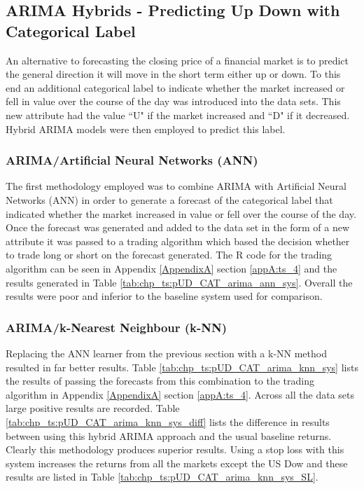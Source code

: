 \subsection{ARIMA Hybrids - Predicting Up Down with Categorical Label}
An alternative to forecasting the closing price of a financial market is to predict the general direction it will move in the short term either up or down. To this end an additional categorical label to indicate whether the market increased or fell in value over the course of the day was introduced into the data sets. This new attribute had the value  \textquotedblleft U" if the market increased and \textquotedblleft D" if it decreased. Hybrid ARIMA models were then employed to predict this label.

\subsubsection{ARIMA/Artificial Neural Networks (ANN)}
The first methodology employed was to combine ARIMA with Artificial Neural Networks (ANN) in order to generate a forecast of the categorical label that indicated whether the market increased in value or fell over the course of the day. Once the forecast was generated and added to the data set in the form of a new attribute it was passed to a trading algorithm which based the decision whether to trade long or short on the forecast generated. The R code for the trading algorithm can be seen in Appendix \ref{AppendixA} section \ref{appA:ts_4} and the results generated in Table \ref{tab:chp_ts:pUD_CAT_arima_ann_sys}. Overall the results were poor and inferior to the baseline system used for comparison. 

\subsubsection{ARIMA/k-Nearest Neighbour (k-NN)}
Replacing the ANN learner from the previous section with a k-NN method resulted in far better results.  Table \ref{tab:chp_ts:pUD_CAT_arima_knn_sys} lists the results of passing the forecasts from this combination to the trading algorithm in Appendix \ref{AppendixA} section \ref{appA:ts_4}. Across all the data sets large positive results are recorded. Table \ref{tab:chp_ts:pUD_CAT_arima_knn_sys_diff} lists the difference in results between using this hybrid ARIMA approach and the usual baseline returns. Clearly this methodology produces superior results. Using a stop loss with this system increases the returns from all the markets except the US Dow and these results are listed in Table \ref{tab:chp_ts:pUD_CAT_arima_knn_sys_SL}.

